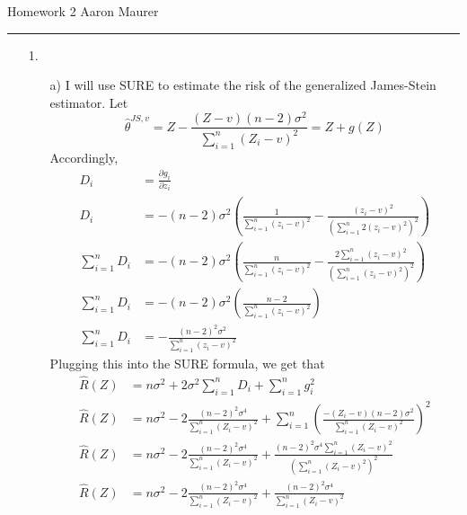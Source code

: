\documentclass[11pt]{article}
\theoremstyle{definition}
\begin{document}
Homework 2 \hfill Aaron Maurer
\vspace{2mm}
\hrule
\vspace{2mm}

\begin{itemize}
    \item[1.]
        \begin{itemize}
            \item[a)]
                I will use SURE to estimate the risk of the generalized James-Stein estimator. Let
                \[\hat\theta^{JS,v}= Z - \frac{(Z-v)(n-2)\sigma^2}{\sum_{i=1}^n (Z_i - v)^2}= Z + g(Z) \]  
                Accordingly, 
                \begin{align*}
                    D_i &= \frac{\partial g_i}{\partial z_i} \\
                    D_i  &= -(n-2)\sigma^2\left(\frac{1}{\sum_{i=1}^n (z_i - v)^2} - \frac{(z_i-v)^2}{\left(\sum_{i=1}^n 2(z_i - v)^2\right)^2}\right) \\
                    \sum_{i=1}^n D_i &= -(n-2)\sigma^2\left(\frac{n}{\sum_{i=1}^n (z_i - v)^2} - \frac{2\sum_{i=1}^n(z_i-v)^2}{\left(\sum_{i=1}^n (z_i - v)^2\right)^2}\right) \\
                    \sum_{i=1}^n D_i &= -(n-2)\sigma^2\left(\frac{n-2}{\sum_{i=1}^n (z_i - v)^2}\right)  \\
                    \sum_{i=1}^n D_i &= -\frac{(n-2)^2\sigma^2}{\sum_{i=1}^n (z_i - v)^2} 
                \end{align*}
                Plugging this into the SURE formula, we get that
                \begin{align*}
                    \hat R (Z) &= n\sigma^2 + 2\sigma^2 \sum_{i=1}^n D_i + \sum_{i=1}^n g_i^2 \\
                    \hat R (Z) &= n\sigma^2 - 2\frac{(n-2)^2\sigma^4}{\sum_{i=1}^n (Z_i - v)^2} + \sum_{i=1}^n \left(\frac{-(Z_i-v)(n-2)\sigma^2}{\sum_{i=1}^n (Z_i - v)^2}\right)^2 \\
                    \hat R (Z) &= n\sigma^2 - 2 \frac{(n-2)^2\sigma^4}{\sum_{i=1}^n (Z_i - v)^2} + \frac{(n-2)^2\sigma^4\sum_{i=1}^n (Z_i - v)^2}{\left(\sum_{i=1}^n (Z_i - v)^2\right)^2} \\
                    \hat R (Z) &= n\sigma^2 - 2 \frac{(n-2)^2\sigma^4}{\sum_{i=1}^n (Z_i - v)^2} + \frac{(n-2)^2\sigma^4}{\sum_{i=1}^n (Z_i - v)^2} \\

\end{align*}
\end{itemize}
\end{itemize}
\end{document}
